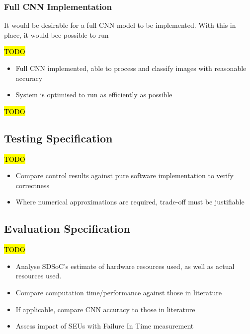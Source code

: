 \documentclass[12pt]{article}
\begin{document}
\subsubsection{Full CNN Implementation}
\label{sec:ProjSpec-Desirable-SEM}

It would be desirable for a full CNN model to be implemented. With this in place, it would bee possible to run 

\hl{TODO}

\begin{itemize}
\item Full CNN implemented, able to process and classify images with reasonable accuracy
\item System is optimised to run as efficiently as possible
\end{itemize}

\hl{TODO}

\subsection{Testing Specification}
\label{sec:ProjSpec-TestSpec}

\hl{TODO}

\begin{itemize}
\item Compare control results against pure software implementation to verify correctness
\item Where numerical approximations are required, trade-off must be justifiable
\end{itemize}

\subsection{Evaluation Specification}
\label{sec:ProjSpec-EvalSpec}

\hl{TODO}

\begin{itemize}
\item Analyse SDSoC's estimate of hardware resources used, as well as actual resources used.
\item Compare computation time/performance against those in literature
\item If applicable, compare CNN accuracy to those in literature
\item Assess impact of SEUs with Failure In Time measurement
\end{itemize}

\newpage
\end{document}
